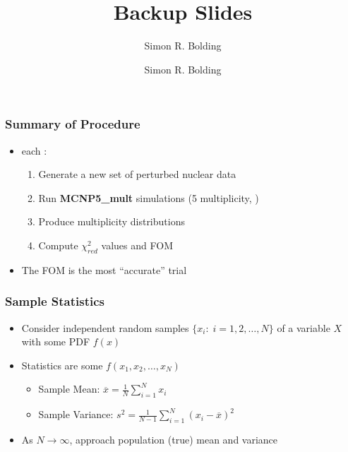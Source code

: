 


\author{Simon R. Bolding}






\appendix
\setcounter{finalframe}{\value{framenumber}}

\author{}
\date{}
\title{Backup Slides}

\maketitle

\author{Simon R. Bolding}


\begin{frame}
\frametitle{Summary of Procedure}	
\begin{itemize}
	\pause
	\item {} each :
	\begin{enumerate}
		\item Generate a new set of perturbed nuclear data
		\item Run \textbf{MCNP5\_mult} simulations (5 multiplicity, )
		\item Produce multiplicity distributions
		\item Compute $\chi^2_{red}$ values and FOM
	\end{enumerate} \pause
	\item The  FOM is the most ``accurate'' trial
\end{itemize}
\end{frame} 

\begin{frame}
\frametitle{Sample Statistics}
\begin{itemize}
  \setlength{\itemsep}{12pt}
	\item Consider independent random samples $\{x_i:\; i=1,2,\ldots,N\}$ of a variable $X$ with some
					PDF $f(x)$

	\item  {\color{blue} Statistics} are some $f(x_1,x_2,\ldots,x_N)$
	\begin{itemize}

	  \item {\color{blue} Sample} Mean: $\displaystyle \overline{x} = \frac{1}{N} \sum_{i=1}^N x_i$
    \vspace{-3pt}
	  \item {\color{blue} Sample} Variance: $\displaystyle s^2 = \frac{1}{N-1} \sum_{i=1}^N (x_i - \overline{x}) ^2$

	\end{itemize} 

	\item As $N\rightarrow \infty$, approach {\color{green} population} (true) mean and variance

\end{itemize}
\end{frame}

